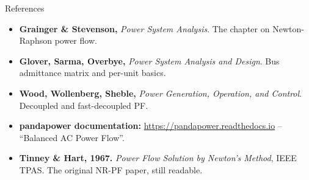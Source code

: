 \documentclass[aspectratio=169,10pt]{beamer}
\begin{document}
\begin{frame}{References}
\footnotesize
\begin{itemize}
  \item \textbf{Grainger \& Stevenson,} \emph{Power System Analysis}. The chapter on Newton-Raphson power flow.
  \item \textbf{Glover, Sarma, Overbye,} \emph{Power System Analysis and Design}. Bus admittance matrix and per-unit basics.
  \item \textbf{Wood, Wollenberg, Sheble,} \emph{Power Generation, Operation, and Control}. Decoupled and fast-decoupled PF.
  \item \textbf{pandapower documentation:} \url{https://pandapower.readthedocs.io} -- ``Balanced AC Power Flow''.
  \item \textbf{Tinney \& Hart, 1967.} \emph{Power Flow Solution by Newton's Method}, IEEE TPAS. The original NR-PF paper, still readable.
\end{itemize}
\end{frame}
\end{document}
